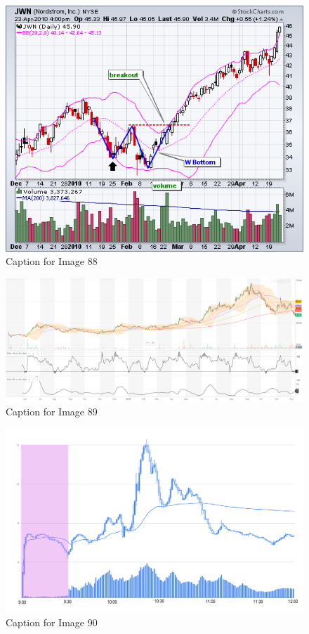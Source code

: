 \documentclass{article}
\begin{document}
\begin{figure}[!htb]
    \centering
    \includegraphics[width=\textwidth]{imgs/88.png}
    \caption{Caption for Image 88}
\end{figure}

\vspace{10pt}

\begin{figure}[!htb]
    \centering
    \includegraphics[width=\textwidth]{imgs/89.png}
    \caption{Caption for Image 89}
\end{figure}

\vspace{10pt}

\begin{figure}[!htb]
    \centering
    \includegraphics[width=\textwidth]{imgs/90.png}
    \caption{Caption for Image 90}
\end{figure}
\end{document}
